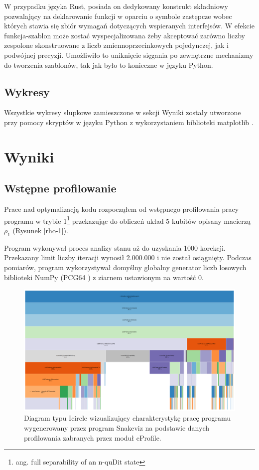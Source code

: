 \documentclass[11pt, a4paper]{article}
\begin{document}
\begin{sloppypar}
    W przypadku języka Rust, posiada on dedykowany konstrukt składniowy pozwalający na deklarowanie
    funkcji w oparciu o symbole zastępcze wobec których stawia się zbiór wymagań dotyczących
    wspieranych interfejsów. W efekcie funkcja-szablon może zostać wyspecjalizowana żeby
    akceptować zarówno liczby zespolone skonstruowane z liczb zmiennoprzecinkowych
    pojedynczej, jak i podwójnej precyzji. Umożliwiło to uniknięcie sięgania po
    zewnętrzne mechanizmy do tworzenia szablonów, tak jak było to konieczne w języku Python.

    \subsection{Wykresy}
    Wszystkie wykresy słupkowe zamieszczone w sekcji Wyniki zostały utworzone przy pomocy
    skryptów w języku Python z wykorzystaniem biblioteki matplotlib \cite{Hunter:2007}.

    \section{Wyniki}
    \FloatBarrier
    \subsection{Wstępne profilowanie}
    Prace nad optymalizacją kodu rozpocząłem od wstępnego profilowania pracy programu w trybie
    1\footnote{ang. full separability of an n-quDit state} przekazując do obliczeń układ
    5 kubitów opisany macierzą $\rho_{1}$ (Rysunek \ref{rho-1}).

    Program wykonywał proces analizy stanu aż do uzyskania 1000 korekcji. Przekazany limit
    liczby iteracji wynosił 2.000.000 i nie został osiągnięty. Podczas pomiarów, program
    wykorzystywał domyślny globalny generator liczb losowych biblioteki NumPy (PCG64 \cite{NumpyDefaultGenerator})
    z ziarnem ustawionym na wartość 0.

    \begin{figure}[ht]
      \centering
      \includegraphics[width=1.0\textwidth]{"resources/profiling_1/graph.png"}
      \caption{Diagram typu Icircle wizualizujący charakterystykę pracę programu wygenerowany przez program Snakeviz na podstawie danych profilowania zabranych przez moduł cProfile.}
      \label{pre-prof-perf}
    \end{figure}


\end{sloppypar}
\end{document}
